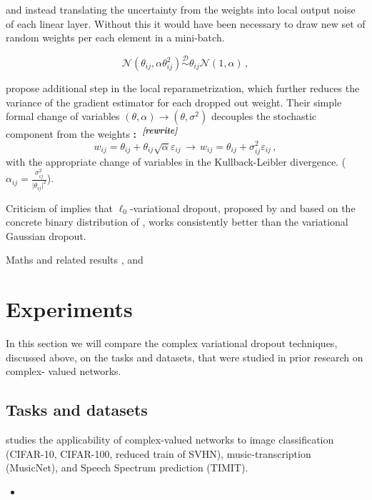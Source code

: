 \documentclass[a4paper,10pt]{article}
\newcommand{\attn}[2]{\textbf{\color{red} #2~\textsuperscript{\textit{[#1]}}}}
\newcommand{\rewrite}[1]{\attn{rewrite}{#1}}
\begin{document}
and instead
translating the uncertainty from the weights into local output noise of each linear layer.
Without this it would have been necessary to draw new set of random weights per each element
in a mini-batch.

$$
  \mathcal{N}(\theta_{ij}, \alpha \theta^2_{ij})
  \overset{\mathcal{D}}{\sim}
  \theta_{ij} \mathcal{N}(1, \alpha)
  \,, $$

\cite{molchanov_variational_2017} propose additional step in the local reparametrization,
which further reduces the variance of the gradient estimator for each dropped out
weight. Their simple formal change of variables $(\theta, \alpha) \to (\theta, \sigma^2)$
decouples the stochastic component from the weights \rewrite:
$$
  w_{ij} = \theta_{ij} + \theta_{ij} \sqrt{\alpha} \varepsilon_{ij}
  \,\to\,
  w_{ij} = \theta_{ij} + \sigma^2_{ij} \varepsilon_{ij}
  \,, $$
with the appropriate change of variables in the Kullback-Leibler divergence.
($\alpha_{ij} = \tfrac{\sigma_{ij}^2}{\lvert \theta_{ij}\rvert^2}$).

Criticism of \cite{gale_state_2019} implies that $\ell_0$-variational dropout,
proposed by \cite{louizos_learning_2017} and based on the concrete binary distribution
of \cite{maddison_concrete_2016}, works consistently better than the variational
Gaussian dropout.

Maths and related results \cite{pav_moments_2015,taubock_complex-valued_2012},
and \cite{karseras_caution:_2014}


\section{Experiments} %
\label{sec:Experiments}

In this section we will compare the complex variational dropout techniques, discussed
above, on the tasks and datasets, that were studied in prior research on complex-%
valued networks.

\subsection{Tasks and datasets} %
\label{sub:tasks_and_datasets}

\cite{trabelsi_deep_2017} studies the applicability of complex-valued networks to
image classification (CIFAR-10, CIFAR-100, reduced train of SVHN), music-transcription
(MusicNet), and Speech Spectrum prediction (TIMIT).
\begin{itemize}
  \item 
\end{itemize}
\end{document}
